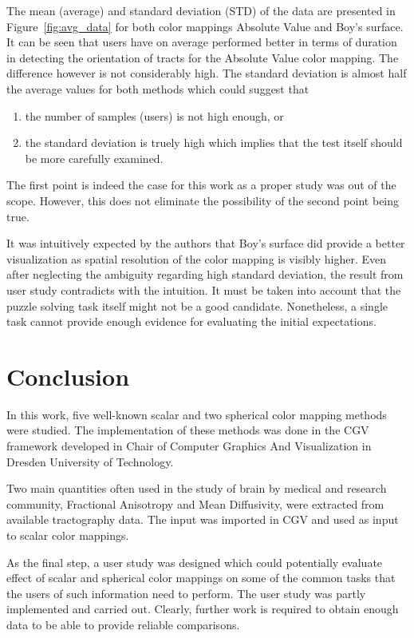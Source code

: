 \documentclass[hyperref, plainreport, noproblem]{cgvpub1}
\begin{document}
The mean (average) and standard deviation (STD) of the data are presented in Figure~\ref{fig:avg_data} for both color mappings Absolute Value and Boy's surface. It can be seen that users have on average performed better in terms of duration in detecting the orientation of tracts for the Absolute Value color mapping. The difference however is not considerably high. The standard deviation is almost half the average values for both methods which could suggest that 
\begin{enumerate}
	\item the number of samples (users) is not high enough, or 
	\item the standard deviation is truely high which implies that the test itself should be more carefully examined.
\end{enumerate}
The first point is indeed the case for this work as a proper study was out of the scope. However, this does not eliminate the possibility of the second point being true. 

It was intuitively expected by the authors that Boy's surface did provide a better visualization as spatial resolution of the color mapping is visibly higher.  Even after neglecting the ambiguity regarding high standard deviation, the result from user study contradicts with the intuition. It must be taken into account that the puzzle solving task itself might not be a good candidate. Nonetheless, a single task cannot provide enough evidence for evaluating the initial expectations. 

\chapter{Conclusion}

In this work, five well-known scalar and two spherical color mapping methods were studied. The implementation of these methods was done in the CGV framework developed in Chair of Computer Graphics And Visualization in Dresden University of Technology. 

Two main quantities often used in the study of brain by medical and research community, Fractional Anisotropy and Mean Diffusivity, were extracted from available tractography data. The input was imported in CGV and used as input to scalar color mappings.

As the final step, a user study was designed which could potentially evaluate effect of scalar and spherical color mappings on some of the common tasks that the users of such information need to perform. The user study was partly implemented and carried out. Clearly, further work is required to obtain enough data to be able to provide reliable comparisons. 




\end{document}
